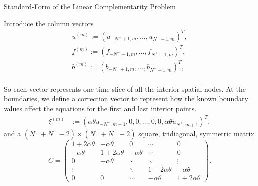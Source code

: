 \documentclass{beamer}
\begin{document}
\begin{frame}{Standard-Form of the Linear Complementarity Problem}

    {\footnotesize \footnotesize
    Introduce the column vectors
    \begin{gather*}
        u^{(m)} := (u_{-N^-+1,m}, \ldots, u_{N^+-1,m})^T, \\
        f^{(m)} := (f_{-N^-+1,m}, \ldots, f_{N^+-1,m})^T,\\
        b^{(m)} := (b_{-N^-+1,m}, \ldots, b_{N^+-1,m})^T,\\
    \end{gather*}
    \vspace{-3em}
    \par So each vector represents one time slice of all the interior spatial nodes. At the boundaries,
    we define a correction vector to represent how the known boundary 
    values affect the equations for the first and last interior points.
    \begin{align*}
    \xi^{(m)} &:= (\alpha \theta u_{-N^-,m+1}, 0, 0, \ldots, 0, 0, \alpha \theta u_{N^+,m+1})^T,
    \end{align*}
    and a $(N^+ + N^- - 2) \times (N^+ + N^- - 2)$ square, tridiagonal, symmetric matrix
    \[
    C = 
    \begin{pmatrix}
    1 + 2\alpha\theta & -\alpha\theta & 0 & \cdots & 0 \\
    -\alpha\theta & 1 + 2\alpha\theta & -\alpha\theta & \cdots & 0 \\
    0 & -\alpha\theta & \ddots & \ddots & \vdots \\
    \vdots & & \ddots & 1 + 2\alpha\theta & -\alpha\theta \\
    0 & 0 & \cdots & -\alpha\theta & 1 + 2\alpha\theta
    \end{pmatrix}.
    \]

    }
    
    
\end{frame}
\end{document}
